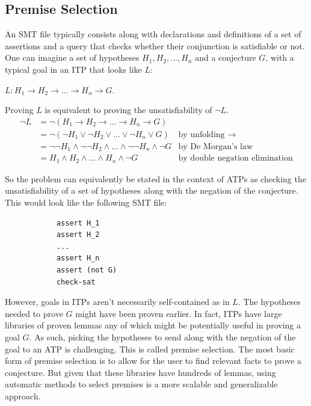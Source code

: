 \documentclass{article}
\begin{document}
	\subsection{Premise Selection}
		An SMT file	typically consists along with 
		declarations and definitions of a set of assertions 
		and a query that checks whether their conjunction is satisfiable or not. 
		One can imagine a set of hypotheses 
		$H_1, H_2, ..., H_n$ and a conjecture $G$, with a 
		typical goal in an ITP that looks like $L$:
		\begin{center}
			$L : H_1 \to H_2 \to ... \to H_n \to G$.
		\end{center}
		Proving $L$ is equivalent to proving the unsatisfiability 
		of $\neg L$.
		\begin{align*}
			\neg L &= \neg (H_1 \to H_2 \to ... \to H_n \to G)\\
			&= \neg (\neg H_1 \lor \neg H_2 \lor ... \lor \neg H_n \lor G)
			& \text{by unfolding }\to \\
			&= \neg \neg H_1 \land \neg \neg H_2 \land ... \land \neg \neg H_n 
			\land \neg G
			& \text{by De Morgan's law}\\
			&= H_1 \land H_2 \land ... \land H_n \land \neg G
			& \text{by double negation elimination}
		\end{align*}
	
		So the problem can equivalently be stated in the context of ATPs
		as checking the unsatisfiability of a set of hypotheses 
		along with the negation of the conjecture. This would look 
		like the following SMT file:
		\begin{verbatim}
			assert H_1
			assert H_2
			...
			assert H_n
			assert (not G)
			check-sat
		\end{verbatim}
		However, goals in ITPs aren't necessarily self-contained 
		as in $L$. The hypotheses needed to prove $G$ 
		might have been proven earlier. In fact, ITPs have large
		libraries of proven lemmas any of which might be potentially 
		useful in proving a goal $G$. As such, picking
		the hypotheses to send along with the negation of the 
		goal to an ATP is challenging. This is called premise 
		selection. The most basic form of premise selection 
		is to allow for the user to find relevant facts 
		to prove a conjecture. But given that these libraries 
		have hundreds of lemmas, using automatic methods 
		to select premises is a more scalable and 
		generalizable approach.
	
\end{document}
